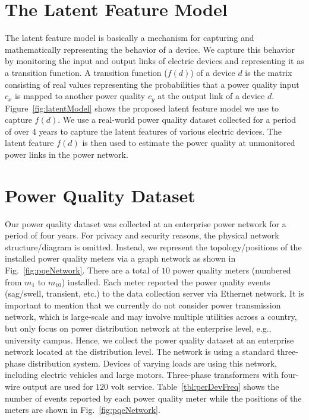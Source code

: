 \vspace{0.5cm}
\section{The Latent Feature Model}
The latent feature model is basically a mechanism for capturing and mathematically representing the behavior of a device. We capture this behavior by monitoring the input and output links of electric devices and representing it as a transition function. A transition function ($f(d)$) of a device $d$ is the matrix consisting of real values representing the probabilities that a power quality input $c_x$ is mapped to another power quality $c_y$ at the output link of a device $d$. Figure~\ref{fig:latentModel} shows the proposed latent feature model we use to capture $f(d)$. We use a real-world power quality dataset collected for a period of over 4 years to capture the latent features of various electric devices. The latent feature $f(d)$ is then used to estimate the power quality at unmonitored power links in the power network.

\vspace{0.5cm}
\section{Power Quality Dataset}
Our power quality dataset was collected at an enterprise power network for a period of four years. For privacy and security reasons, the physical network structure/diagram is omitted. Instead, we represent the topology/positions of the installed power quality meters via a graph network as shown in Fig.~\ref{fig:pqeNetwork}. There are a total of $10$ power quality meters (numbered from $m_1$ to $m_{10}$) installed. Each meter reported the power quality events (sag/swell, transient, etc.) to the data collection server via Ethernet network. It is important to mention that we currently do not consider power transmission network, which is large-scale and may involve multiple utilities across a country, but only focus on power distribution network at the enterprise level, e.g., university campus. Hence, we collect the power quality dataset at an enterprise network located at the distribution level. The network is using a standard three-phase distribution system. Devices of varying loads are using this network, including electric vehicles and large motors. Three-phase transformers with four-wire output are used for $120$ volt service. Table~\ref{tbl:perDevFreq} shows the number of events reported by each power quality meter while the positions of the meters are shown in Fig.~\ref{fig:pqeNetwork}.

